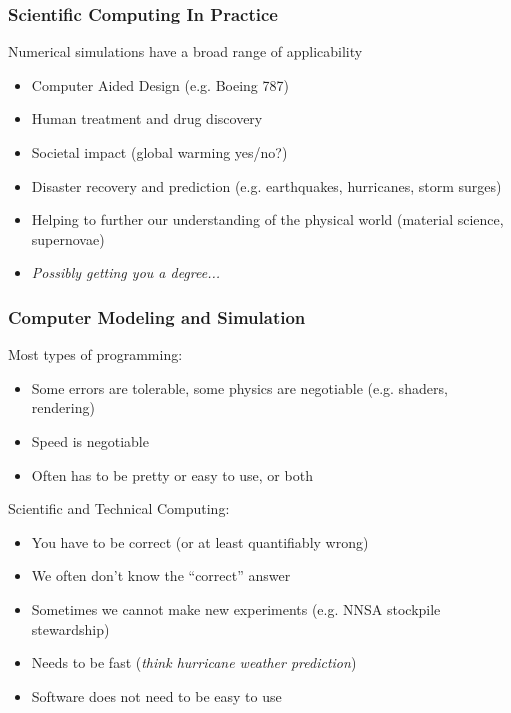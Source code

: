 \documentclass[mathserif]{beamer}
\begin{document}
\begin{frame}
  \frametitle{Scientific Computing In Practice}

  \begin{block}{Numerical simulations have a broad range of applicability}
    \begin{itemize}
    \item Computer Aided Design (e.g. Boeing 787)
    \item Human treatment and drug discovery
    \item Societal impact (global warming yes/no?)
    \item Disaster recovery and prediction (e.g. earthquakes, hurricanes, storm surges)
    \item Helping to further our understanding of the physical world
	  (material science, supernovae)
    \item {\em Possibly getting you a degree...}
    \end{itemize}
\end{block}
\end{frame}

\begin{frame}
  \frametitle{Computer Modeling and Simulation}

  \begin{block}{Most types of programming:}
    \begin{itemize}
    \item Some errors are tolerable, some physics are negotiable
      (e.g. shaders, rendering)
    \item Speed is negotiable
    \item Often has to be pretty or easy to use, or both
    \end{itemize}
  \end{block}

  \begin{block}{Scientific and Technical Computing:}
    \begin{itemize}
    \item You have to be correct (or at least quantifiably wrong)
    \item We often don't know the ``correct'' answer      
    \item Sometimes we cannot make new experiments (e.g. NNSA
      stockpile stewardship)
    \item Needs to be fast ({\em think hurricane weather prediction})
    \item Software does not need to be easy to use
    \end{itemize}
  \end{block}

\end{frame}
\end{document}
